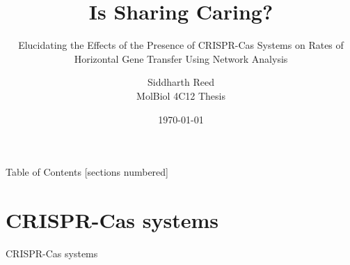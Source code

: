 \documentclass[dvipsnames]{beamer}
\title{{\fontsize{40}{50}\selectfont Is Sharing Caring?}}
\subtitle{\vspace{-0.2in}Elucidating the Effects of the Presence of CRISPR-Cas Systems on Rates of Horizontal Gene Transfer Using Network Analysis\vspace{0.1in}}
\date{\today}
\author{Siddharth Reed\\
        MolBiol 4C12 Thesis
       }
\institute{Golding Lab,\\
           Biology Department,\\
           McMaster University
          }
\begin{document}
\watermarkoff %
\begin{frame}[t,plain]
    \titlepage
\end{frame}
\begin{frame}[plain]{Table of Contents}
  [sections numbered]
  \tableofcontents[hideallsubsections]
    \addtocounter{framenumber}{-1}
\end{frame}
\section{CRISPR-Cas systems}
\begin{frame}{}
    \begin{center}
        \Huge \textcolor{OliveGreen}{CRISPR-Cas systems}
    \end{center}
    \addtocounter{framenumber}{-1}
\end{frame}
\end{document}
